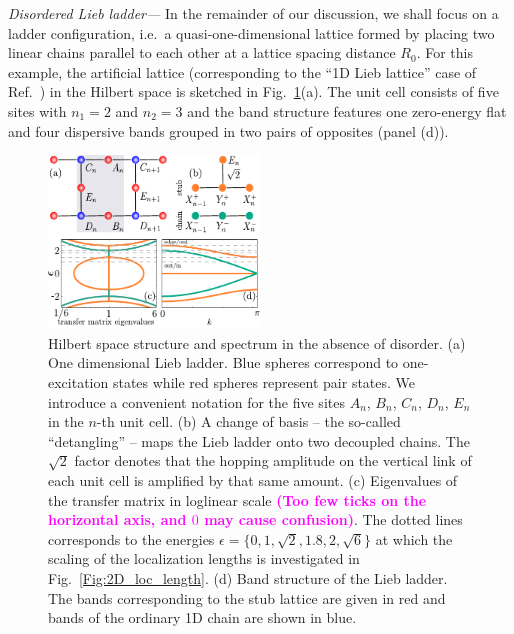 \documentclass[prl,aps,twocolumn,showpacs,superscriptaddress,longbibliography]{revtex4-1}
\newcommand{\tochange}[1]{\textcolor{magenta}{#1}}
\newcommand{\mm}[1]{{\tochange{\footnotesize{\bf (#1)}}}}
\begin{document}
\emph{Disordered Lieb ladder---} In the remainder of our discussion, we shall focus on a ladder configuration, i.e.~a quasi-one-dimensional lattice formed by placing two linear chains parallel to each other at a lattice spacing distance $R_0$. For this example, the artificial lattice (corresponding to the ``1D Lieb lattice'' case of Ref.~\cite{Leykam2017}) in the Hilbert space is sketched in Fig.~\ref{Fig:decoupling}(a). The unit cell consists of five sites with $n_1 = 2$ and $n_2 = 3$ and the band structure features one zero-energy flat and four dispersive bands grouped in two pairs of opposites (panel (d)). 
%
\begin{figure}
% 	    

	      \includegraphics[width=0.5\textwidth]{graphics/decoupling.pdf}

		\caption{Hilbert space structure and spectrum in the absence of disorder. (a) One dimensional Lieb ladder. Blue spheres correspond to one-excitation states while red spheres represent pair states. We introduce a convenient notation for the five sites $A_n$, $B_n$, $C_n$, $D_n$, $E_n$ in the $n$-th unit cell. (b) A change of basis -- the so-called ``detangling'' \cite{a_Flach_EPL_14,Leykam2017} -- maps the Lieb ladder onto two decoupled chains. The $\sqrt{2}$ factor denotes that the hopping amplitude on the vertical link of each unit cell is amplified by that same amount.
		     (c) Eigenvalues of the transfer matrix in loglinear scale \mm{Too few ticks on the horizontal axis, and $0$ may cause confusion}.
		     The dotted lines corresponds to the energies $\epsilon = \{0,1, \sqrt 2, 1.8, 2, \sqrt 6\}$ at which the scaling of the localization lengths is investigated in Fig.~\ref{Fig:2D_loc_length}.
                    (d) Band structure of the Lieb ladder. The bands corresponding to the stub lattice are given in red and bands of the ordinary 1D chain are shown in blue.
                    }
  
	\label{Fig:decoupling}
\end{figure}  
%
%
\end{document}
